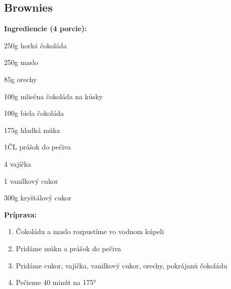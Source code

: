 \setcounter{step}{0}

\subsection{ Brownies }

\begin{ingredient}
  
  \def\portions{  }
  \textbf{ {\normalsize Ingrediencie (4 porcie):} }

  \begin{main}
      \item 250g horká čokoláda
      \item 250g maslo
      \item 85g orechy
      \item 100g mliečna čokoláda na kúsky
      \item 100g biela čokoláda
      \item 175g hladká múka
      \item 1ČL prášok do pečiva
      \item 4 vajíčka
      \item 1 vanilkový cukor
      \item 300g kryštálový cukor
  \end{main}
  
\end{ingredient}
\begin{recipe}
\textbf{ {\normalsize Príprava:} }
\begin{enumerate}

  \item{Čokoládu a maslo rozpustíme vo vodnom kúpeli}
  \item{Pridáme múku a prášok do pečiva}
  \item{Pridáme cukor, vajíčka, vanilkový cukor, orechy, pokrájanú čokoládu}
  \item{Pečieme 40 minút na 175°}

\end{enumerate}
\end{recipe}

\begin{notes}
  
\end{notes}	
\clearpage
